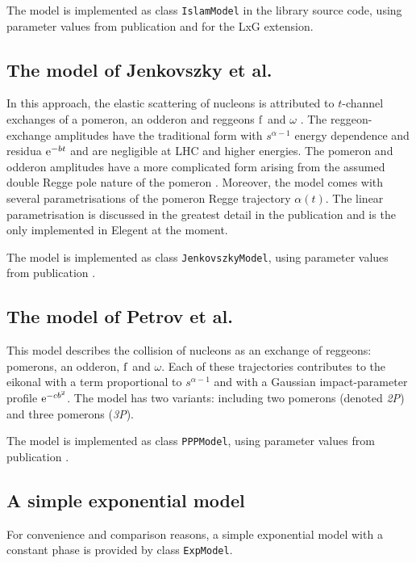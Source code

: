 \documentclass[preprint,12pt]{elsarticle}
\def\class#1{{\tt #1}}
\def\e{{\rm e}}
\begin{document}
The model is implemented as class \class{IslamModel} in the library source code, using parameter values from publication \cite{islam06} and \cite{islam09} for the LxG extension.

\subsection{The model of Jenkovszky et al.}

In this approach, the elastic scattering of nucleons is attributed to $t$-channel exchanges of a pomeron, an odderon and reggeons $\rm f$ and $\omega$ \cite{jenkovszky11}. The reggeon-exchange amplitudes have the traditional form with $s^{\alpha - 1}$ energy dependence and residua $\e^{-bt}$ and are negligible at LHC and higher energies. The pomeron and odderon amplitudes have a more complicated form arising from the assumed double Regge pole nature of the pomeron \cite[section 2]{jenkovszky86}. Moreover, the model comes with several parametrisations of the pomeron Regge trajectory $\alpha(t)$. The linear parametrisation is discussed in the greatest detail in the publication and is the only implemented in Elegent at the moment. 

The model is implemented as class \class{JenkovszkyModel}, using parameter values from publication \cite{jenkovszky11}.

\subsection{The model of Petrov et al.}

This model \cite{petrov02} describes the collision of nucleons as an exchange of reggeons: pomerons, an odderon, $\rm f$ and $\omega$. Each of these trajectories contributes to the eikonal with a term proportional to $s^{\alpha - 1}$ and with a Gaussian impact-parameter profile $\e^{-c b^2}$. The model has two variants: including two pomerons (denoted {\em 2P}\/) and three pomerons ({\em 3P}\/).

The model is implemented as class \class{PPPModel}, using parameter values from publication \cite{petrov02}.

\subsection{A simple exponential model}

For convenience and comparison reasons, a simple exponential model with a constant phase is provided by class \class{ExpModel}.
\end{document}
